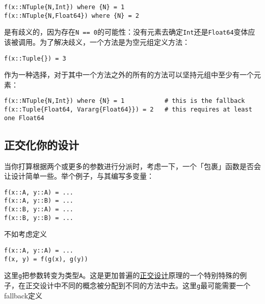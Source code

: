 \begin{verbatim}
f(x::NTuple{N,Int}) where {N} = 1
f(x::NTuple{N,Float64}) where {N} = 2
\end{verbatim}



是有歧义的，因为存在\texttt{N == 0}的可能性：没有元素去确定\texttt{Int}还是\texttt{Float64}变体应该被调用。为了解决歧义，一个方法是为空元组定义方法：




\begin{verbatim}
f(x::Tuple{}) = 3
\end{verbatim}



作为一种选择，对于其中一个方法之外的所有的方法可以坚持元组中至少有一个元素：




\begin{verbatim}
f(x::NTuple{N,Int}) where {N} = 1           # this is the fallback
f(x::Tuple{Float64, Vararg{Float64}}) = 2   # this requires at least one Float64
\end{verbatim}



\hypertarget{2934107525015609338}{}


\subsection{正交化你的设计}



当你打算根据两个或更多的参数进行分派时，考虑一下，一个「包裹」函数是否会让设计简单一些。举个例子，与其编写多变量：




\begin{verbatim}
f(x::A, y::A) = ...
f(x::A, y::B) = ...
f(x::B, y::A) = ...
f(x::B, y::B) = ...
\end{verbatim}



不如考虑定义




\begin{verbatim}
f(x::A, y::A) = ...
f(x, y) = f(g(x), g(y))
\end{verbatim}



这里\texttt{g}把参数转变为类型\texttt{A}。这是更加普遍的\href{https://en.wikipedia.org/wiki/Orthogonality\_(programming)}{正交设计}原理的一个特别特殊的例子，在正交设计中不同的概念被分配到不同的方法中去。这里\texttt{g}最可能需要一个fallback定义




